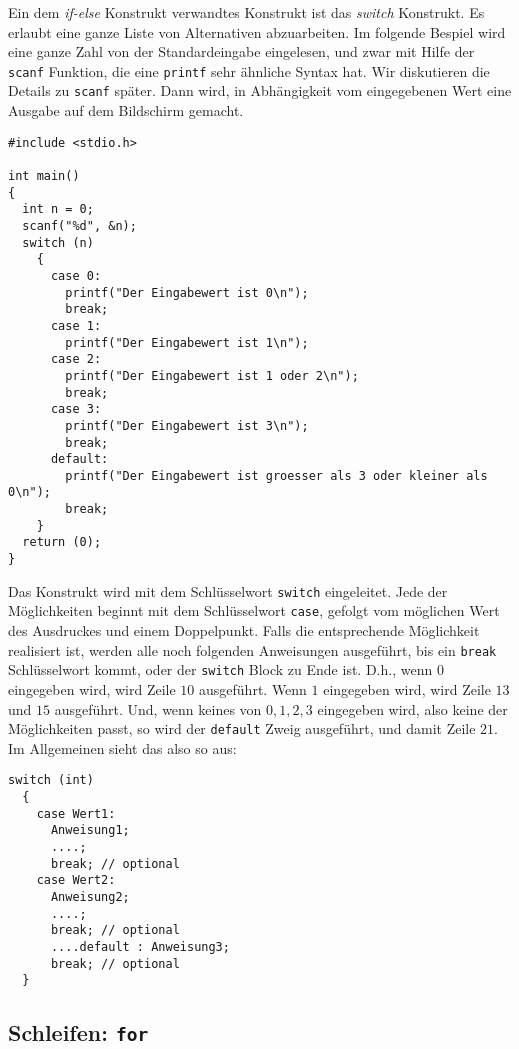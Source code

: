 Ein dem \emph{if-else} Konstrukt verwandtes Konstrukt ist das \emph{switch} Konstrukt.
Es erlaubt eine ganze Liste von Alternativen abzuarbeiten.
Im folgende Bespiel wird eine ganze Zahl von der Standardeingabe eingelesen, und zwar mit Hilfe der \verb|scanf| Funktion, die eine \verb|printf| sehr ähnliche Syntax hat.
Wir diskutieren die Details zu \verb|scanf| später.
Dann wird, in Abhängigkeit vom eingegebenen Wert eine Ausgabe auf dem Bildschirm gemacht.
\begin{lstlisting}
#include <stdio.h>

int main()
{
  int n = 0;
  scanf("%d", &n);
  switch (n)
    {
      case 0:
        printf("Der Eingabewert ist 0\n");
        break;
      case 1:
        printf("Der Eingabewert ist 1\n");
      case 2:
        printf("Der Eingabewert ist 1 oder 2\n");
        break;
      case 3:
        printf("Der Eingabewert ist 3\n");
        break;
      default:
        printf("Der Eingabewert ist groesser als 3 oder kleiner als 0\n");
        break;
    }
  return (0);
}
\end{lstlisting}
Das Konstrukt wird mit dem Schlüsselwort \verb|switch| eingeleitet.
Jede der Möglichkeiten beginnt mit dem Schlüsselwort \verb|case|, gefolgt vom möglichen Wert des Ausdruckes und einem Doppelpunkt. 
Falls die entsprechende Möglichkeit realisiert ist, werden alle noch folgenden Anweisungen ausgeführt, bis ein \verb|break| Schlüsselwort kommt, oder der \verb|switch| Block zu Ende ist.
D.h., wenn $0$ eingegeben wird, wird Zeile $10$ ausgeführt.
Wenn $1$ eingegeben wird, wird Zeile $13$ und $15$ ausgeführt.
Und, wenn keines von $0,1,2,3$ eingegeben wird, also keine der Möglichkeiten passt, so wird der \verb|default| Zweig ausgeführt, und damit Zeile $21$.
Im Allgemeinen sieht das also so aus:
\begin{lstlisting}[caption={switch statement}, belowcaptionskip=0.3em]
switch (int)
  {
    case Wert1:
      Anweisung1;
      ....;
      break; // optional
    case Wert2:
      Anweisung2;
      ....;
      break; // optional
      ....default : Anweisung3;
      break; // optional
  }
\end{lstlisting}

\subsection{Schleifen: \texttt{for}}

